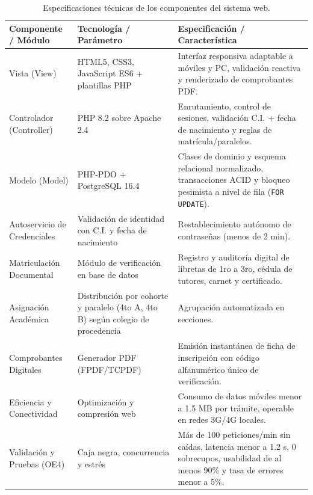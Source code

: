 \begin{table}[htbp]
    \centering
    \caption{Especificaciones técnicas de los componentes del sistema web.}
    \label{tab:especificaciones_tecnicas}
    \begin{tabularx}{\textwidth}{L L L}
        \toprule
        \textbf{Componente / Módulo} & \textbf{Tecnología / Parámetro} & \textbf{Especificación / Característica} \\
        \midrule
        Vista (View) & HTML5, CSS3, JavaScript ES6 + plantillas PHP & Interfaz responsiva adaptable a móviles y PC, validación reactiva y renderizado de comprobantes PDF. \\
        Controlador (Controller) & PHP 8.2 sobre Apache 2.4 & Enrutamiento, control de sesiones, validación C.I. + fecha de nacimiento y reglas de matrícula/paralelos. \\
        Modelo (Model) & PHP-PDO + PostgreSQL 16.4 & Clases de dominio y esquema relacional normalizado, transacciones ACID y bloqueo pesimista a nivel de fila (\texttt{FOR UPDATE}). \\
        Autoservicio de Credenciales & Validación de identidad con C.I. y fecha de nacimiento & Restablecimiento autónomo de contraseñas (menos de 2 min). \\
        Matriculación Documental & Módulo de verificación en base de datos & Registro y auditoría digital de libretas de 1ro a 3ro, cédula de tutores, carnet y certificado. \\
        Asignación Académica & Distribución por cohorte y paralelo (4to A, 4to B) según colegio de procedencia & Agrupación automatizada en secciones. \\
        Comprobantes Digitales & Generador PDF (FPDF/TCPDF) & Emisión instantánea de ficha de inscripción con código alfanumérico único de verificación. \\
        Eficiencia y Conectividad & Optimización y compresión web & Consumo de datos móviles menor a 1.5 MB por trámite, operable en redes 3G/4G locales. \\
        Validación y Pruebas (OE4) & Caja negra, concurrencia y estrés & Más de 100 peticiones/min sin caídas, latencia menor a 1.2 s, 0 sobrecupos, usabilidad de al menos 90\% y tasa de errores menor a 5\%. \\
        \bottomrule
    \end{tabularx}
\end{table}
